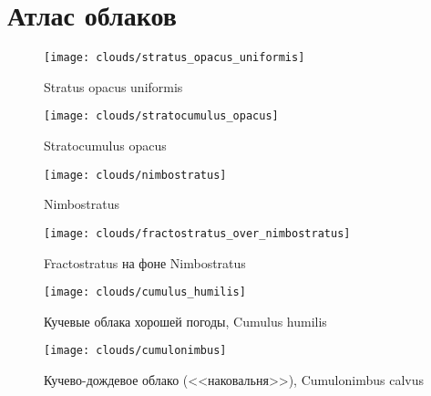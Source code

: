 \chapter{Атлас облаков}\label{app:5}

  \begin{sidewaysfigure*}
    \centering
    \texttt{[image: clouds/stratus\_opacus\_uniformis]}
    \caption[Stratus opacus uniformis]{Stratus opacus uniformis\protect}
    \label{fig:stratus}
  \end{sidewaysfigure*}

  \begin{sidewaysfigure*}
    \centering
    \texttt{[image: clouds/stratocumulus\_opacus]}
    \caption{Stratocumulus opacus}
    \label{fig:stratocumulus-opacus}
  \end{sidewaysfigure*}

  \begin{sidewaysfigure*}
    \centering
    \texttt{[image: clouds/nimbostratus]}
    \caption{Nimbostratus}
    \label{fig:nimbostratus}
  \end{sidewaysfigure*}
  
  \begin{sidewaysfigure*}
    \centering
    \texttt{[image: clouds/fractostratus\_over\_nimbostratus]}
    \caption{Fractostratus на фоне Nimbostratus}
    \label{fig:fractostratus}
  \end{sidewaysfigure*}

  \begin{sidewaysfigure*}
    \centering
    \texttt{[image: clouds/cumulus\_humilis]}
    \caption{Кучевые облака хорошей погоды, Cumulus humilis}
    \label{fig:112}
  \end{sidewaysfigure*}

  \begin{figure*}
    \centering
    \texttt{[image: clouds/cumulonimbus]}
    \caption{Кучево-дождевое облако (<<наковальня>>), Cumulonimbus calvus}
    \label{fig:113}
  \end{figure*}

